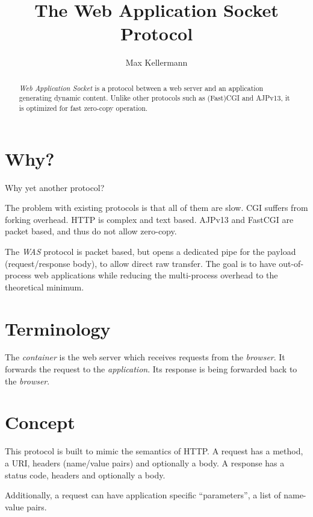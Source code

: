 \documentclass[a4paper,12pt]{article}
\begin{document}
\title{The Web Application Socket Protocol}
\author{Max Kellermann}

\maketitle

\begin{abstract}
\emph{Web Application Socket} is a protocol between a web server and
an application generating dynamic content.  Unlike other protocols
such as (Fast)CGI and AJPv13, it is optimized for fast zero-copy
operation.
\end{abstract}

\setcounter{tocdepth}{2}
\tableofcontents
\newpage

\section{Why?}

Why yet another protocol?

The problem with existing protocols is that all of them are slow.  CGI
suffers from forking overhead.  HTTP is complex and text based.
AJPv13 and FastCGI are packet based, and thus do not allow zero-copy.

The \emph{WAS} protocol is packet based, but opens a dedicated pipe
for the payload (request/response body), to allow direct raw transfer.
The goal is to have out-of-process web applications while reducing the
multi-process overhead to the theoretical minimum.

\section{Terminology}

The \emph{container} is the web server which receives requests from
the \emph{browser}.  It forwards the request to the
\emph{application}.  Its response is being forwarded back to the
\emph{browser}.

\section{Concept}

This protocol is built to mimic the semantics of HTTP.  A request has
a method, a URI, headers (name/value pairs) and optionally a body.  A
response has a status code, headers and optionally a body.

Additionally, a request can have application specific ``parameters'',
a list of name-value pairs.
\end{document}
